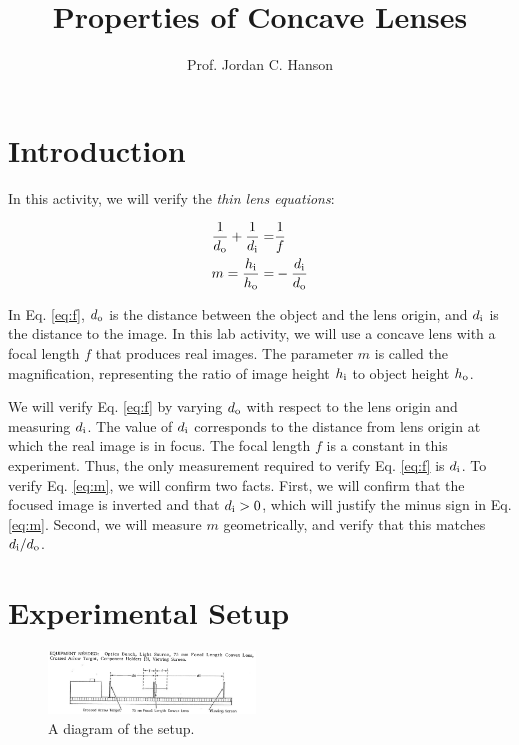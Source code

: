 \documentclass[12pt,twocolumn]{article}
\title{Properties of Concave Lenses}
\author{Prof. Jordan C. Hanson}
\begin{document}
\small
\maketitle

\section{Introduction}

\noindent
In this activity, we will verify the \textit{thin lens equations}:

\begin{align}
\frac{1}{d_{\rm o}} + \frac{1}{d_{\rm i}} =& \frac{1}{f} \label{eq:f} \\
m = \frac{h_{\rm i}}{h_{\rm o}} =& -\frac{d_{\rm i}}{d_{\rm o}}  \label{eq:m}
\end{align}

In Eq. \ref{eq:f}, $d_{\rm o}$ is the distance between the object and the lens origin, and $d_{\rm i}$ is the distance to the image.  In this lab activity, we will use a concave lens with a focal length $f$ that produces real images.  The parameter $m$ is called the magnification, representing the ratio of image height $h_{\rm i}$ to object height $h_{\rm o}$.

We will verify Eq. \ref{eq:f} by varying $d_{\rm o}$ with respect to the lens origin and measuring $d_{\rm i}$.  The value of $d_{\rm i}$ corresponds to the distance from lens origin at which the real image is in focus. The focal length $f$ is a constant in this experiment.  Thus, the only measurement required to verify Eq. \ref{eq:f} is $d_{\rm i}$.  To verify Eq. \ref{eq:m}, we will confirm two facts.  First, we will confirm that the focused image is inverted and that $d_{\rm i}>0$, which will justify the minus sign in Eq. \ref{eq:m}.  Second, we will measure $m$ geometrically, and verify that this matches $d_{\rm i}/d_{\rm o}$.

\section{Experimental Setup}

\begin{figure}[ht]
\centering
\includegraphics[width=0.49\textwidth,trim=0cm 0cm 0cm 2cm,clip=true]{equip.png}
\caption{\label{fig:equip} A diagram of the setup.}
\end{figure}
\end{document}
